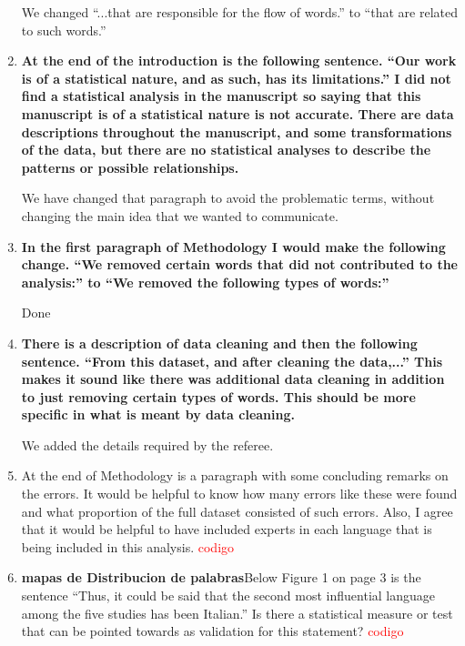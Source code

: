 \documentclass{article}
\begin{document}
\begin{enumerate}
We changed ``...that are responsible for the flow of words.'' to 
``that are related to such words.''

\item \textbf{At the end of the introduction is the following sentence. “Our work
is of a statistical nature, and as such, has its limitations.” I did
not find a statistical analysis in the manuscript so saying that this
manuscript is of a statistical nature is not accurate. There are data
descriptions throughout the manuscript, and some transformations of
the data, but there are no statistical analyses to describe the
patterns or possible relationships.}

We have changed that paragraph to avoid the problematic terms, without changing the main
idea that we wanted to communicate. 
\item \textbf{In the first paragraph of Methodology I would make the following
change. “We removed certain words that did not contributed to the
analysis:” to “We removed the following types of words:”}

Done
\item  \textbf{There is a description of data cleaning and then the following
sentence. ``From this dataset, and after cleaning the data,...'' This
makes it sound like there was additional data cleaning in addition to
just removing certain types of words. This should be more specific in
what is meant by data cleaning.}

We added the details required by the referee.

\item At the end of Methodology is a paragraph with some concluding %
remarks on the errors. It would be helpful to know how many errors
like these were found and what proportion of the full dataset
consisted of such errors. Also, I agree that it would be helpful to
have included experts in each language that is being included in this
analysis. \textcolor{red}{codigo}

\item \textbf{mapas de Distribucion de palabras}Below Figure 1 on page 3 is the sentence “Thus, it could be said 
that the second most influential language among the five studies has
been Italian.” Is there a statistical measure or test that can be
pointed towards as validation for this statement? \textcolor{red}{codigo}


\end{enumerate}
\end{document}
